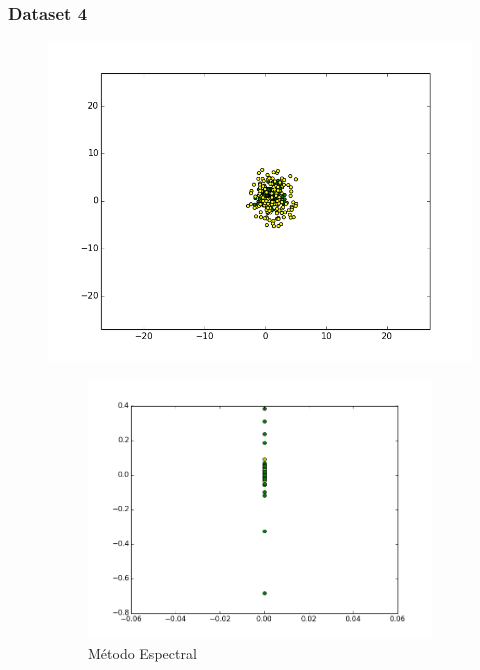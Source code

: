 \documentclass[a4paper,12pt]{article}    %
\begin{document}
\subsubsection{Dataset 4}
\begin{figure}[!ht]
	\centering
	\includegraphics[width=\linewidth]{img/10dataset.png}
	\caption*{N=300, cov1=[[3, 0], [0, 9]], cov2=[[1, 0.2], [0.2, 2.1]]}
	\begin{subfigure}{.45\textwidth}
		\centering
		\includegraphics[width=\linewidth]{img/11spectral.png}
		\caption{Método Espectral}
	\end{subfigure}
	\begin{subfigure}{.45\textwidth}
		\centering

\end{subfigure}
\end{figure}
\end{document}

